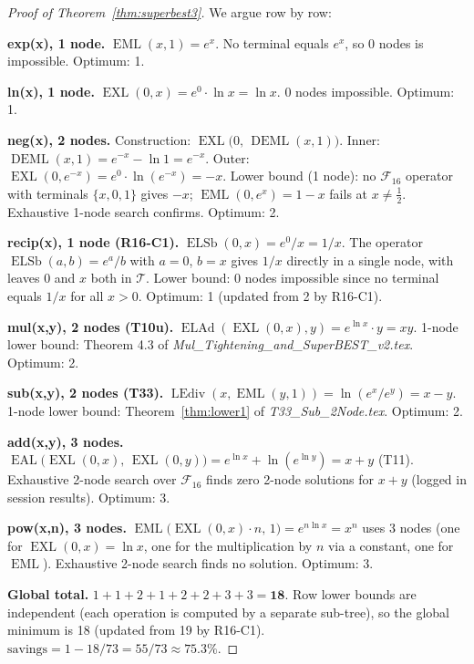 \documentclass[12pt,a4paper]{article}
\theoremstyle{definition}
\newcommand{\EML}{\operatorname{EML}}
\newcommand{\EXL}{\operatorname{EXL}}
\newcommand{\EAL}{\operatorname{EAL}}
\newcommand{\DEML}{\operatorname{DEML}}
\newcommand{\ELAd}{\operatorname{ELAd}}
\newcommand{\ELSb}{\operatorname{ELSb}}
\newcommand{\LEdiv}{\operatorname{LEdiv}}
\begin{document}
\begin{proof}[Proof of Theorem~\ref{thm:superbest3}]
We argue row by row:

\medskip
\noindent\textbf{exp(x), 1 node.}
$\EML(x,1)=e^x$. No terminal equals $e^x$, so 0 nodes is impossible.
Optimum: 1.

\medskip
\noindent\textbf{ln(x), 1 node.}
$\EXL(0,x)=e^0\cdot\ln x=\ln x$. 0 nodes impossible.  Optimum: 1.

\medskip
\noindent\textbf{neg(x), 2 nodes.}
Construction: $\EXL\bigl(0,\,\DEML(x,1)\bigr)$.
Inner: $\DEML(x,1)=e^{-x}-\ln 1=e^{-x}$.
Outer: $\EXL(0,e^{-x})=e^0\cdot\ln(e^{-x})=-x$.
Lower bound (1 node): no $\mathcal{F}_{16}$ operator with terminals
$\{x,0,1\}$ gives $-x$; $\EML(0,e^x)=1-x$ fails at $x\neq\tfrac{1}{2}$.
Exhaustive 1-node search confirms.  Optimum: 2.

\medskip
\noindent\textbf{recip(x), 1 node (R16-C1).}
$\ELSb(0,x) = e^0/x = 1/x$.
The operator $\ELSb(a,b) = e^a/b$ with $a=0$, $b=x$ gives $1/x$ directly
in a single node, with leaves $0$ and $x$ both in $\mathcal{T}$.
Lower bound: 0 nodes impossible since no terminal equals $1/x$ for all
$x > 0$.  Optimum: 1 (updated from 2 by R16-C1).

\medskip
\noindent\textbf{mul(x,y), 2 nodes (T10u).}
$\ELAd(\EXL(0,x),y)=e^{\ln x}\cdot y=xy$.
1-node lower bound: Theorem 4.3 of \textit{Mul\_Tightening\_and\_SuperBEST\_v2.tex}.
Optimum: 2.

\medskip
\noindent\textbf{sub(x,y), 2 nodes (T33).}
$\LEdiv(x,\EML(y,1))=\ln(e^x/e^y)=x-y$.
1-node lower bound: Theorem~\ref{thm:lower1} of \textit{T33\_Sub\_2Node.tex}.
Optimum: 2.

\medskip
\noindent\textbf{add(x,y), 3 nodes.}
$\EAL\!\bigl(\EXL(0,x),\,\EXL(0,y)\bigr)=e^{\ln x}+\ln(e^{\ln y})=x+y$ (T11).
Exhaustive 2-node search over $\mathcal{F}_{16}$ finds zero 2-node solutions
for $x+y$ (logged in session results).  Optimum: 3.

\medskip
\noindent\textbf{pow(x,n), 3 nodes.}
$\EML\!\bigl(\EXL(0,x)\cdot n,\,1\bigr) = e^{n\ln x} = x^n$ uses 3 nodes
(one for $\EXL(0,x)=\ln x$, one for the multiplication by $n$ via a constant,
one for $\EML$).  Exhaustive 2-node search finds no solution.  Optimum: 3.

\medskip
\noindent\textbf{Global total.}
$1+1+2+1+2+2+3+3 = \mathbf{18}$.
Row lower bounds are independent (each operation is computed by a separate
sub-tree), so the global minimum is 18 (updated from 19 by R16-C1).
$\text{savings} = 1 - 18/73 = 55/73 \approx 75.3\%$.
\end{proof}
\end{document}
